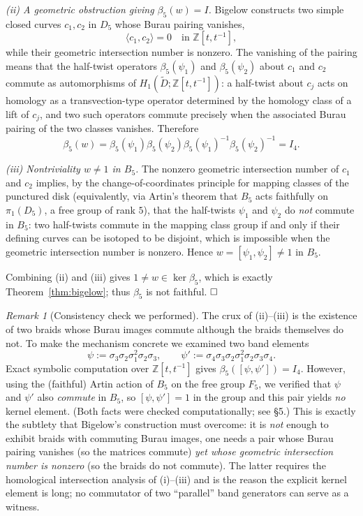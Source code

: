 \documentclass{amsart}
\theoremstyle{remark}
\newtheorem{remark}{Remark}
\begin{document}
\emph{(ii) A geometric obstruction giving $\beta_5(w)=I$.}
Bigelow constructs two simple closed curves $c_1,c_2$ in $D_5$ whose Burau
pairing vanishes,
\[
\langle c_1,c_2\rangle=0 \quad\text{in }\mathbb Z[t,t^{-1}],
\]
while their geometric intersection number is nonzero. The vanishing of the
pairing means that the half-twist operators $\beta_5(\psi_1)$ and
$\beta_5(\psi_2)$ about $c_1$ and $c_2$ commute as automorphisms of
$H_1(\widetilde D;\mathbb Z[t,t^{-1}])$: a half-twist about $c_j$ acts on
homology as a transvection-type operator determined by the homology class of a
lift of $c_j$, and two such operators commute precisely when the associated
Burau pairing of the two classes vanishes. Therefore
\[
\beta_5(w)=\beta_5(\psi_1)\beta_5(\psi_2)\beta_5(\psi_1)^{-1}
\beta_5(\psi_2)^{-1}=I_4 .
\]

\emph{(iii) Nontriviality $w\ne1$ in $B_5$.}
The nonzero geometric intersection number of $c_1$ and $c_2$ implies, by the
change-of-coordinates principle for mapping classes of the punctured disk
(equivalently, via Artin's theorem that $B_5$ acts faithfully on
$\pi_1(D_5)$, a free group of rank $5$), that the half-twists $\psi_1$ and
$\psi_2$ do \emph{not} commute in $B_5$: two half-twists commute in the mapping
class group if and only if their defining curves can be isotoped to be disjoint,
which is impossible when the geometric intersection number is nonzero. Hence
$w=[\psi_1,\psi_2]\ne1$ in $B_5$.

Combining (ii) and (iii) gives $1\ne w\in\ker\beta_5$, which is exactly
Theorem~\ref{thm:bigelow}; thus $\beta_5$ is not faithful. $\hfill\square$

\begin{remark}[Consistency check we performed]
The crux of (ii)--(iii) is the existence of two braids whose Burau images
commute although the braids themselves do not. To make the mechanism concrete
we examined two band elements
\[
\psi:=\sigma_3\sigma_2\sigma_1^{2}\sigma_2\sigma_3,\qquad
\psi':=\sigma_4\sigma_3\sigma_2\sigma_1^{2}\sigma_2\sigma_3\sigma_4 .
\]
Exact symbolic computation over $\mathbb Z[t,t^{-1}]$ gives
$\beta_5([\psi,\psi'])=I_4$. However, using the (faithful) Artin action of
$B_5$ on the free group $F_5$, we verified that $\psi$ and $\psi'$ also
\emph{commute} in $B_5$, so $[\psi,\psi']=1$ in the group and this pair yields
\emph{no} kernel element. (Both facts were checked computationally; see \S5.)
This is exactly the subtlety that Bigelow's construction must overcome: it is
\emph{not} enough to exhibit braids with commuting Burau images, one needs a
pair whose Burau pairing vanishes (so the matrices commute) \emph{yet whose
geometric intersection number is nonzero} (so the braids do not commute). The
latter requires the homological intersection analysis of (i)--(iii) and is the
reason the explicit kernel element is long; no commutator of two
``parallel'' band generators can serve as a witness.
\end{remark}
\end{document}
